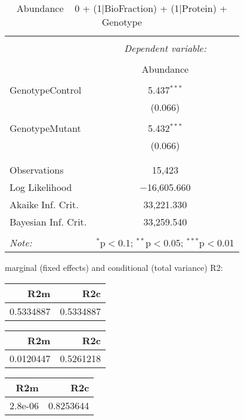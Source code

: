 \documentclass[11pt]{report}
\begin{document}
\begin{table}[!htbp] \centering 
  \caption{Abundance ~ 0 + (1|BioFraction) + (1|Protein) + Genotype} 
  \label{} 
\begin{tabular}{@{\extracolsep{5pt}}lc} 
\\[-1.8ex]\hline 
\hline \\[-1.8ex] 
 & \multicolumn{1}{c}{\textit{Dependent variable:}} \\ 
\cline{2-2} 
\\[-1.8ex] & Abundance \\ 
\hline \\[-1.8ex] 
 GenotypeControl & 5.437$^{***}$ \\ 
  & (0.066) \\ 
  & \\ 
 GenotypeMutant & 5.432$^{***}$ \\ 
  & (0.066) \\ 
  & \\ 
\hline \\[-1.8ex] 
Observations & 15,423 \\ 
Log Likelihood & $-$16,605.660 \\ 
Akaike Inf. Crit. & 33,221.330 \\ 
Bayesian Inf. Crit. & 33,259.540 \\ 
\hline 
\hline \\[-1.8ex] 
\textit{Note:}  & \multicolumn{1}{r}{$^{*}$p$<$0.1; $^{**}$p$<$0.05; $^{***}$p$<$0.01} \\ 
\end{tabular} 
\end{table} 
marginal (fixed effects) and conditional (total variance) R2:

\begin{tabular}{r|r}
\hline
R2m & R2c\\
\hline
0.5334887 & 0.5334887\\
\hline
\end{tabular}

\begin{tabular}{r|r}
\hline
R2m & R2c\\
\hline
0.0120447 & 0.5261218\\
\hline
\end{tabular}

\begin{tabular}{r|r}
\hline
R2m & R2c\\
\hline
2.8e-06 & 0.8253644\\
\hline
\end{tabular}
\end{document}
